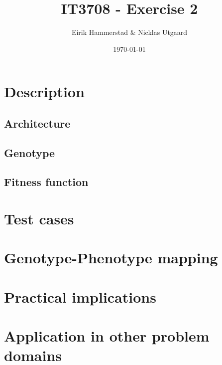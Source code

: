 \documentclass[12pt]{article}
\title{IT3708 - Exercise 2}
\author{
        Eirik Hammerstad \& Nicklas Utgaard
}
\date{\today}
\begin{document}
\maketitle
\pagebreak
\tableofcontents
\pagebreak
\section{Description}
	\subsection{Architecture}
	\subsection{Genotype}
	\subsection{Fitness function}
\section{Test cases}
\section{Genotype-Phenotype mapping}
\section{Practical implications}
\section{Application in other problem domains}
\end{document}
